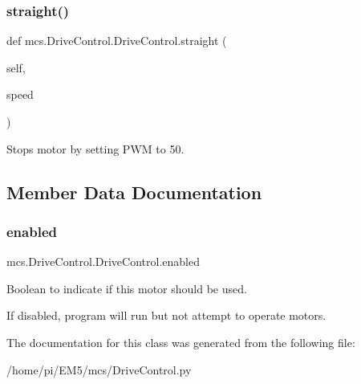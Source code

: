 \subsubsection{\texorpdfstring{straight()}{straight()}}
{\footnotesize\ttfamily def mcs.\+Drive\+Control.\+Drive\+Control.\+straight (\begin{DoxyParamCaption}\item[{}]{self,  }\item[{}]{speed }\end{DoxyParamCaption})}



Stops motor by setting P\+WM to 50. 



\subsection{Member Data Documentation}
\mbox{\label{classmcs_1_1DriveControl_1_1DriveControl_a3750f3e1b8c2ccb46938cd1b920f305d}} 
\subsubsection{\texorpdfstring{enabled}{enabled}}
{\footnotesize\ttfamily mcs.\+Drive\+Control.\+Drive\+Control.\+enabled}



Boolean to indicate if this motor should be used. 

If disabled, program will run but not attempt to operate motors. 

The documentation for this class was generated from the following file\+:\begin{DoxyCompactItemize}
\item 
/home/pi/\+E\+M5/mcs/Drive\+Control.\+py\end{DoxyCompactItemize}

